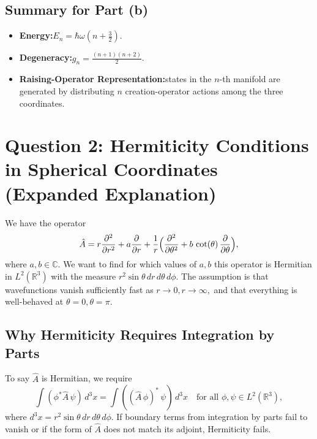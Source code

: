\documentclass[12pt]{article}
\begin{document}
\subsection*{Summary for Part (b)}
\begin{itemize}
  \item \textbf{Energy:}\quad \(E_n = \hbar \omega (n + \tfrac{3}{2})\).
  \item \textbf{Degeneracy:}\quad \(g_n = \frac{(n+1)(n+2)}{2}\).
  \item \textbf{Raising-Operator Representation:}\quad states in the \(n\)-th manifold are generated by distributing \(n\) creation-operator actions among the three coordinates.
\end{itemize}





\section*{Question 2: Hermiticity Conditions in Spherical Coordinates (Expanded Explanation)}

We have the operator
\begin{equation}
\hat{A} = r \frac{\partial^2}{\partial r^2} + a \frac{\partial}{\partial r}
+ \frac{1}{r}\Bigl(\frac{\partial^2}{\partial \theta^2} + b \,\cot(\theta)\,\frac{\partial}{\partial \theta}\Bigr),
\end{equation}
where \(a,b \in \mathbb{C}\). We want to find for which values of \(a,b\) this operator is Hermitian in \(L^2(\mathbb{R}^3)\) with the measure \(r^2 \sin\theta\, dr\, d\theta\, d\phi\). The assumption is that wavefunctions vanish sufficiently fast as \(r\to 0, r\to\infty,\) and that everything is well-behaved at \(\theta=0,\theta=\pi\).

\subsection*{Why Hermiticity Requires Integration by Parts}
To say \(\hat{A}\) is Hermitian, we require
\begin{equation}
\int (\phi^* \hat{A}\,\psi)\, d^3x 
=
\int ((\hat{A}\,\phi)^*\,\psi)\, d^3x
\quad \text{for all }\phi,\psi\in L^2(\mathbb{R}^3),
\end{equation}
where \(d^3x = r^2\sin\theta\,dr\,d\theta\,d\phi\). If boundary terms from integration by parts fail to vanish or if the form of \(\hat{A}\) does not match its adjoint, Hermiticity fails.
\end{document}
